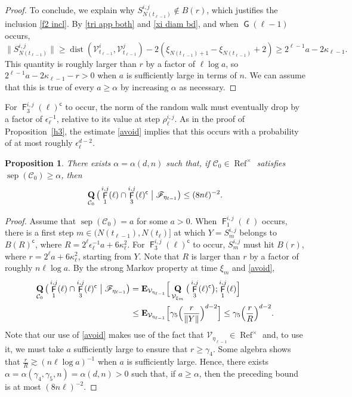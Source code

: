 \documentclass[11pt,reqno]{amsart}
\newtheorem{proposition}[lemma]{Proposition}
\theoremstyle{definition}
\numberwithin{equation}{section}
\newcommand{\1}{\mathbf{1}}
\newcommand{\eps}{\epsilon}
\DeclareMathOperator{\dist}{dist}
\newcommand{\EE}{\mathbf{E}}
\DeclareMathOperator{\PPprod}{\mathbf{Q}}
\DeclareMathOperator{\sep}{sep}
\DeclareMathOperator{\Refcon}{\mathrm{Ref}}
\newcommand{\cc}{\mathsf{c}}
\DeclareMathOperator{\GG}{\mathsf{G}}
\DeclareMathOperator{\FF}{\mathsf{F}}
\newcommand{\CC}{\mathcal{C}}
\newcommand{\VV}{\mathcal{V}}
\begin{document}
\begin{proof}
To conclude, we explain why $S^{i,j}_{N(t_{\ell-1})} \notin B(r)$, which justifies the inclusion \eqref{f2 incl}. By \eqref{tri app both} and \eqref{xi diam bd}, and when $\GG (\ell-1)$ occurs,
\[
\| S_{N(t_{\ell-1})}^{i,j} \| \geq \dist (\VV_{t_{\ell-1}}^i, \VV_{t_{\ell-1}}^j) - 2 \left(\xi_{N(t_{\ell-1})+1} - \xi_{N(t_{\ell-1})} + 2\right) \geq 2^{\ell-1}a - 2 \kappa_{\ell-1}.
\]
This quantity is roughly larger than $r$ by a factor of $\ell \log a$, so $2^{\ell-1}a - 2\kappa_{\ell-1} - r > 0$ when $a$ is sufficiently large in terms of $n$. We can assume that this is true of every $a \geq \alpha$ by increasing $\alpha$ as necessary.
\end{proof}

For $\FF_3^{i,j} (\ell)^\cc$ to occur, the norm of the random walk must eventually drop by a factor of $\eps_\ell^{-1}$, relative to its value at step $\rho_\ell^{i,j}$. As in the proof of Proposition~\ref{h3}, the estimate \eqref{avoid} implies that this occurs with a probability of at most roughly $\eps_\ell^{d-2}$.

\begin{proposition}\label{h4}
There exists $\alpha = \alpha (d,n)$ such that, if $\CC_0 \in \Refcon^\times$ satisfies $\sep (\CC_0) \geq \alpha$, then
\begin{equation*}
\PPprod_{\CC_0} \big( \FF_1^{i,j} (\ell) \cap \FF_3^{i,j} (\ell)^\cc \bigm\vert \mathscr{F}_{\eta_{\ell-1}} \big) \leq (8n\ell)^{-2}.
\end{equation*}
\end{proposition}

\begin{proof}
Assume that $\sep (\CC_0) = a$ for some $a > 0$. When $\FF_1^{i,j} (\ell)$ occurs, there is a first step $m \in (N (t_{\ell-1}), N (t_\ell)]$ at which $Y = S_m^{i,j}$ belongs to $B(R)^\cc$, where $R = 2^\ell \eps_\ell^{-1} a + 6\kappa_\ell^2$. For $\FF_3^{i,j} (\ell)^\cc$ to occur, $S_m^{i,j}$ must hit $B(r)$, where $r = 2^\ell a + 6\kappa_\ell^2$, starting from $Y$. Note that $R$ is larger than $r$ by a factor of roughly $n \ell \log a$. By the strong Markov property at time $\xi_m$ and \eqref{avoid},
\begin{align*}
\PPprod_{\CC_0} \big( \FF_1^{i,j} (\ell) \cap \FF_3^{i,j} (\ell)^\cc \bigm\vert \mathscr{F}_{\eta_{\ell-1}} \big)
&= \EE_{\VV_{\eta_{\ell-1}}} \Big[ \PPprod_{\VV_{\xi_m}} \big( \FF_3^{i,j} (\ell)^\cc \big); \FF_1^{i,j} (\ell) \Big] \\  
&\leq \EE_{\VV_{\eta_{\ell-1}}} \Big[ \gamma_5 \Big( \frac{r}{\| Y \|} \Big)^{d-2} \Big] \leq \gamma_5 \Big( \frac{r}{R} \Big)^{d-2}.
\end{align*}
Note that our use of \eqref{avoid} makes use of the fact that $\VV_{\eta_{\ell-1}} \in \Refcon^\times$ and, to use it, we must take $a$ sufficiently large to ensure that $r \geq \gamma_4$. 
Some algebra shows that $\frac{r}{R} \gtrsim (n\ell \log a)^{-1}$ when $a$ is sufficiently large. Hence, there exists $\alpha = \alpha (\gamma_4,\gamma_5,n) = \alpha (d,n) > 0$ such that, if $a \geq \alpha$, then the preceding bound is at most $(8n\ell)^{-2}$.
\end{proof}
\end{document}
